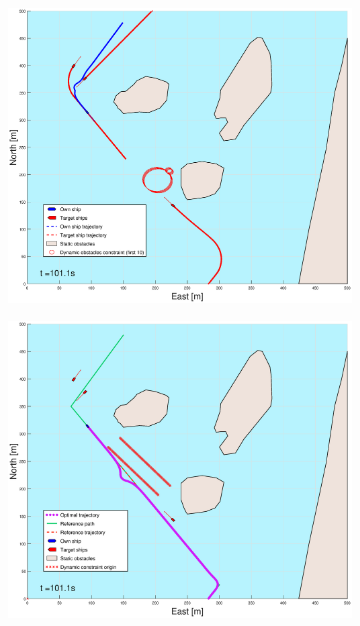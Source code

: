\begin{figure}[!ht]
\begin{subfigure}[b]{0.499\textwidth}
    \end{subfigure}
    \hfill
    \\
    \begin{subfigure}[b]{0.49\textwidth}
        \centering
        \includegraphics[width=\textwidth]{Images/Figures/Helloya_Rev/_Simple_1fig1_time=101}
    \end{subfigure}
    \hfill
    \begin{subfigure}[b]{0.499\textwidth}
        \centering
        \includegraphics[width=\textwidth]{Images/Figures/Helloya_Rev/_Simple_1fig999_time=101}
    \end{subfigure}
    \hfill
\end{figure}%
